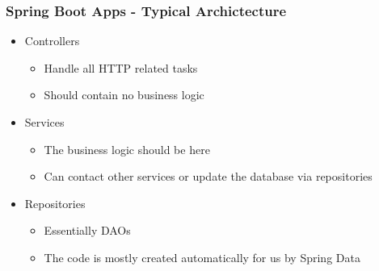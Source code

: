 \documentclass[10pt,xcolor=pdflatex, table]{beamer}
\begin{document}
\begin{frame}\frametitle{Spring Boot Apps - Typical Archictecture}
  \begin{itemize}
    \item Controllers
    \begin{itemize}
        \item Handle all HTTP related tasks
        \item Should contain no business logic
    \end{itemize}
    \item Services
    \begin{itemize}
        \item The business logic should be here
        \item Can contact other services or update the database via repositories
    \end{itemize}
    \item Repositories
    \begin{itemize}
        \item Essentially DAOs
        \item The code is mostly created automatically for us by Spring Data
    \end{itemize}
  \end{itemize}
\end{frame}
\end{document}
